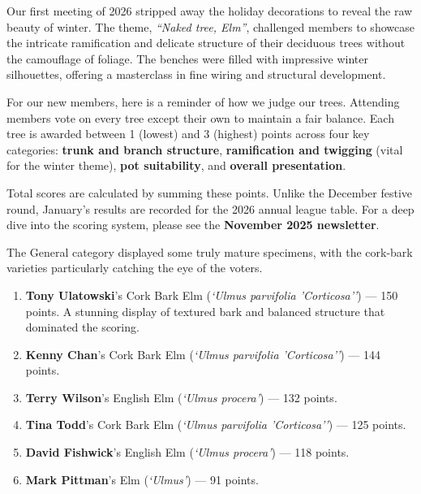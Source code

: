 \label{2026-01-totm}
\noindent
Our first meeting of 2026 stripped away the holiday decorations to reveal the raw beauty of winter.
The theme, \textit{``Naked tree, Elm''}, challenged members to showcase the intricate ramification and delicate structure of their deciduous trees without the camouflage of foliage.
The benches were filled with impressive winter silhouettes, offering a masterclass in fine wiring and structural development.

\medskip
\noindent
For our new members, here is a reminder of how we judge our trees.
Attending members vote on every tree except their own to maintain a fair balance.
Each tree is awarded between 1 (lowest) and 3 (highest) points across four key categories: \textbf{trunk and branch structure}, \textbf{ramification and twigging} (vital for the winter theme), \textbf{pot suitability}, and \textbf{overall presentation}.

\noindent
Total scores are calculated by summing these points.
Unlike the December festive round, January’s results are recorded for the 2026 annual league table.
For a deep dive into the scoring system, please see the \textbf{November 2025 newsletter}.

\medskip
{}
\noindent
The General category displayed some truly mature specimens, with the cork-bark varieties particularly catching the eye of the voters.

\begin{enumerate}
    \item \textbf{Tony Ulatowski}'s Cork Bark Elm (\textit{`Ulmus parvifolia 'Corticosa''}) --- 150 points.
    A stunning display of textured bark and balanced structure that dominated the scoring.
    \item \textbf{Kenny Chan}'s Cork Bark Elm (\textit{`Ulmus parvifolia 'Corticosa''}) --- 144 points.
    \item \textbf{Terry Wilson}'s English Elm (\textit{`Ulmus procera'}) --- 132 points.
    \item \textbf{Tina Todd}'s Cork Bark Elm (\textit{`Ulmus parvifolia 'Corticosa''}) --- 125 points.
    \item \textbf{David Fishwick}'s English Elm (\textit{`Ulmus procera'}) --- 118 points.
    \item \textbf{Mark Pittman}'s Elm (\textit{`Ulmus'}) --- 91 points.
\end{enumerate}

